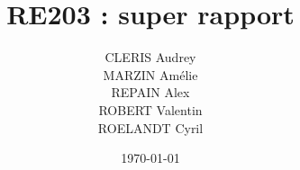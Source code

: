 \documentclass{report}
\title{RE203 : super rapport}
\author{
    CLERIS Audrey     \\
    MARZIN Amélie     \\
    REPAIN Alex       \\
    ROBERT Valentin   \\
    ROELANDT Cyril
}
\date{\today}
\begin{document}
\maketitle

\tableofcontents
\newpage





\nocite{*}


\end{document}
